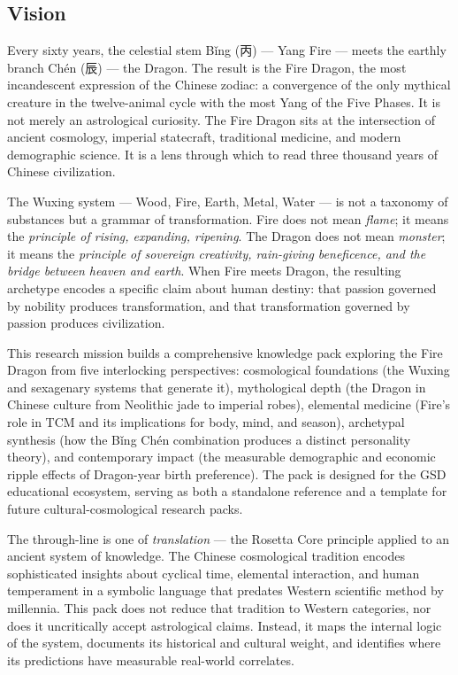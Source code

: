 \documentclass[11pt,letterpaper]{article}
\begin{document}
\subsection{Vision}

Every sixty years, the celestial stem Bǐng (丙) --- Yang Fire --- meets the earthly branch Chén (辰) --- the Dragon. The result is the Fire Dragon, the most incandescent expression of the Chinese zodiac: a convergence of the only mythical creature in the twelve-animal cycle with the most Yang of the Five Phases. It is not merely an astrological curiosity. The Fire Dragon sits at the intersection of ancient cosmology, imperial statecraft, traditional medicine, and modern demographic science. It is a lens through which to read three thousand years of Chinese civilization.

The Wuxing system --- Wood, Fire, Earth, Metal, Water --- is not a taxonomy of substances but a grammar of transformation. Fire does not mean \emph{flame}; it means the \emph{principle of rising, expanding, ripening}. The Dragon does not mean \emph{monster}; it means the \emph{principle of sovereign creativity, rain-giving beneficence, and the bridge between heaven and earth}. When Fire meets Dragon, the resulting archetype encodes a specific claim about human destiny: that passion governed by nobility produces transformation, and that transformation governed by passion produces civilization.

This research mission builds a comprehensive knowledge pack exploring the Fire Dragon from five interlocking perspectives: cosmological foundations (the Wuxing and sexagenary systems that generate it), mythological depth (the Dragon in Chinese culture from Neolithic jade to imperial robes), elemental medicine (Fire's role in TCM and its implications for body, mind, and season), archetypal synthesis (how the Bǐng Chén combination produces a distinct personality theory), and contemporary impact (the measurable demographic and economic ripple effects of Dragon-year birth preference). The pack is designed for the GSD educational ecosystem, serving as both a standalone reference and a template for future cultural-cosmological research packs.

The through-line is one of \emph{translation} --- the Rosetta Core principle applied to an ancient system of knowledge. The Chinese cosmological tradition encodes sophisticated insights about cyclical time, elemental interaction, and human temperament in a symbolic language that predates Western scientific method by millennia. This pack does not reduce that tradition to Western categories, nor does it uncritically accept astrological claims. Instead, it maps the internal logic of the system, documents its historical and cultural weight, and identifies where its predictions have measurable real-world correlates.
\end{document}
